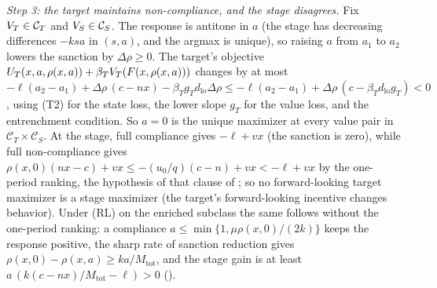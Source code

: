 \emph{Step 3: the target maintains non-compliance, and the stage disagrees.} Fix
$V_T\in\mathcal C_T$ and $V_S\in\mathcal C_S$. The response is antitone in
$a$ (the stage has decreasing differences $-ksa$ in $(s,a)$, and the argmax
is unique), so raising $a$ from $a_1$ to $a_2$ lowers the sanction by
$\Delta\rho\ge0$. The target's objective
$U_T(x,a,\rho(x,a))+\beta_TV_T(F(x,\rho(x,a)))$ changes by at most
$-\ell(a_2-a_1)+\Delta\rho\,(c-nx)-\beta_Tg_Td_{\mathrm{lo}}\Delta\rho
\le-\ell(a_2-a_1)+\Delta\rho\,(c-\beta_Td_{\mathrm{lo}}g_T)<0$,
using (T2) for the state loss, the lower slope $g_T$ for the value loss, and
the entrenchment condition. So $a=0$ is the unique maximizer at every value pair in
$\mathcal C_T\times\mathcal C_S$. At
the stage, full compliance gives $-\ell+vx$ (the sanction is zero), while
full non-compliance gives $\rho(x,0)(nx-c)+vx\le-(u_0/q)(c-n)+vx<-\ell+vx$ by the
one-period ranking, the hypothesis of that clause of ;
so no forward-looking target maximizer is a stage maximizer (the target's
forward-looking incentive changes behavior). Under
\textup{(RL)} on the enriched subclass the same follows without the one-period ranking: a
compliance $a\le\min\{1,\mu\rho(x,0)/(2k)\}$ keeps the response positive, the
sharp rate of sanction reduction gives $\rho(x,0)-\rho(x,a)\ge ka/M_{\mathrm{tot}}$, and the
stage gain is at least $a\,(k(c-nx)/M_{\mathrm{tot}}-\ell)>0$
().

